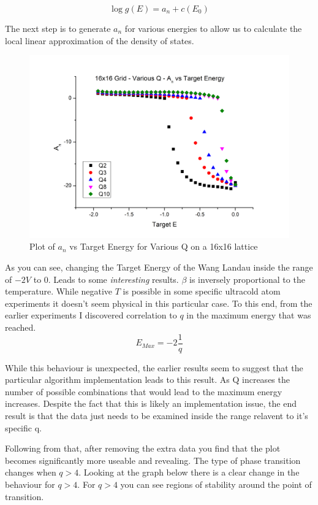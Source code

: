 \documentclass[10pt,a4paper]{article}
\begin{document}
\begin{equation}
\log{g(E)} = a_{n}+c(E_0)
\end{equation}

The next step is to generate $a_n$ for various energies to allow us to calculate the local linear approximation of the density of states.

\begin{figure}[H]
  \centering
  \includegraphics[width=\textwidth]{variousq16x16-full.png}
  \caption{Plot of $a_n$ vs Target Energy for Various Q on a 16x16 lattice}
\end{figure}

As you can see, changing the Target Energy of the Wang Landau inside the range of $-2 V$ to $0$.
Leads to some \textit{interesting} results. $\beta$ is inversely proportional to the temperature.
While negative $T$ is possible in some specific ultracold atom experiments it doesn't seem physical in this particular case.
To this end, from the earlier experiments I discovered correlation to $q$ in the maximum energy that was reached.
\begin{equation}
    E_{Max} = -2 \frac{1}{q}
\end{equation}

While this behaviour is unexpected, the earlier results seem to suggest that the particular algorithm implementation leads to this result.
As Q increases the number of possible combinations that would lead to the maximum energy increases.
Despite the fact that this is likely an implementation issue, the end result is that the data just needs to be examined inside the range relavent to it's specific q.

Following from that, after removing the extra data you find that the plot becomes significantly more useable and revealing.
The type of phase transition changes when $q>4$.
Looking at the graph below there is a clear change in the behaviour for $q>4$.
For $q>4$ you can see regions of stability around the point of transition.
\end{document}
